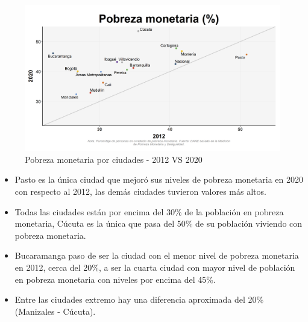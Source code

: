     \begin{figure}[H]
        \caption{Pobreza monetaria por ciudades - 2012 VS 2020 \label{map_result_2} }
        \begin{center}
        \includegraphics[width=\textwidth,keepaspectratio]{img/var_261_scatter_time.png}
        \end{center}
    \end{figure}
            \begin{itemize}
                    \item Pasto es la única ciudad que mejoró sus niveles de pobreza monetaria en 2020 con respecto al 2012, las demás ciudades tuvieron valores más altos.
                    \item Todas las ciudades están por encima del 30\% de la población en pobreza monetaria, Cúcuta es la única que pasa del 50\% de su población viviendo con pobreza monetaria.
                    \item Bucaramanga paso de ser la ciudad con el menor nivel de pobreza monetaria en 2012, cerca del 20\%, a ser la cuarta ciudad con mayor nivel de población en pobreza monetaria con niveles por encima del 45\%.
                    \item Entre las ciudades extremo hay una diferencia aproximada del 20\% (Manizales - Cúcuta).
                    \end{itemize}

